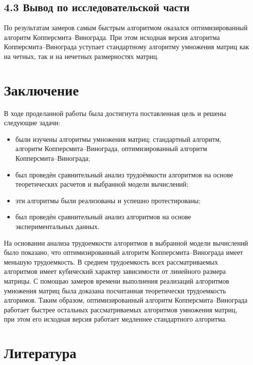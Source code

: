\documentclass[12pt, a4paper]{report}
\begin{document}
\section*{4.3 Вывод по исследовательской части}

По результатам замеров самым быстрым алгоритмом оказался оптимизированный алгоритм Копперсмита--Винограда. При этом исходная версия алгоритма Копперсмита--Винограда уступает стандартному алгоритму умножения матриц как на четных, так и на нечетных размерностях матриц.


\chapter*{Заключение}

В ходе проделанной работы была достигнута поставленная цель и решены следующие задачи:

\begin{itemize}
	\item были изучены алгоритмы умножения матриц: стандартный алгоритм, алгоритм Копперсмита--Винограда, оптимизированный алгоритм \newline Копперсмита--Винограда;
	\item был проведён сравнительный анализ трудоёмкости алгоритмов на основе теоретических расчетов и выбранной модели вычислений;
	\item эти алгоритмы были реализованы и успешно протестированы;
	\item был проведён сравнительный анализ алгоритмов на основе экспериментальных данных.
\end{itemize}

На основании анализа трудоемкости алгоритмов в выбранной модели вычислений было показано, что оптимизированный алгоритм Копперсмита--Винограда имеет меньшую трудоемкость. В среднем трудоемкость всех рассматриваемых алгоритмов имеет кубический характер зависимости от линейного размера матрицы. С помощью замеров времени выполнения реализаций алгоритмов умножения матриц была доказана посчитанная теоретически трудоемкость алгоримов. Таким образом, оптимизированный алгоритм Копперсмита--Винограда работает быстрее остальных рассматриваемых алгоритмов умножения матриц, при этом его исходная версия работает медленнее стандартного алгоритма.

\chapter*{Литература}
\end{document}
